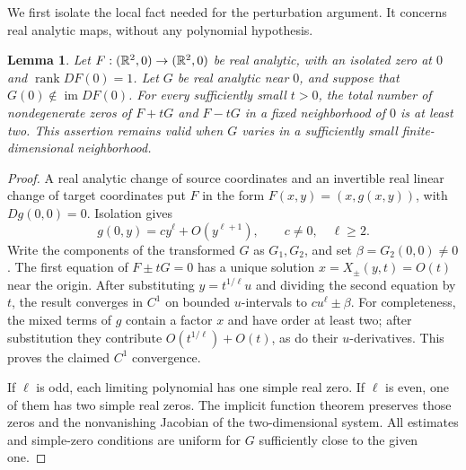 \documentclass[UTF8,11pt]{ctexart}
\newtheorem{lem}[thm]{Lemma}
\theoremstyle{definition}
\numberwithin{equation}{section}
\DeclareMathOperator{\rank}{rank}\DeclareMathOperator{\tr}{tr}\DeclareMathOperator{\Tr}{Tr}
\begin{document}
We first isolate the local fact needed for the perturbation argument.
It concerns real analytic maps, without any polynomial hypothesis.
\begin{lem}\label{b:lem:rankone}
Let $F:(\mathbb R^2,0)\to(\mathbb R^2,0)$ be real analytic, with an isolated zero
at $0$ and $\rank DF(0)=1$. Let $G$ be real analytic near $0$, and
suppose that $G(0)\notin\operatorname{im}DF(0)$.
For every sufficiently small $t>0$, the total number of nondegenerate
zeros of $F+tG$ and $F-tG$ in a fixed neighborhood of $0$ is at least
two. This assertion remains valid when $G$ varies in a sufficiently
small finite-dimensional neighborhood.
\end{lem}
\begin{proof}
A real analytic change of source coordinates and an invertible real
linear change of target coordinates put $F$ in the form
$F(x,y)=(x,g(x,y))$, with $Dg(0,0)=0$. Isolation gives
\[
 g(0,y)=cy^\ell+O(y^{\ell+1}),\qquad c\ne0,\quad\ell\ge2.
\]
Write the components of the transformed $G$ as $G_1,G_2$, and set
$\beta=G_2(0,0)\ne0$. The first equation of $F\pm tG=0$ has a unique
solution $x=X_\pm(y,t)=O(t)$ near the origin. After substituting
$y=t^{1/\ell}u$ and dividing the second equation by $t$, the result
converges in $C^1$ on bounded $u$-intervals to $cu^\ell\pm\beta$.
For completeness, the mixed terms of $g$ contain a factor $x$ and have
order at least two; after substitution they contribute
$O(t^{1/\ell})+O(t)$, as do their $u$-derivatives. This proves the
claimed $C^1$ convergence.

If $\ell$ is odd, each limiting polynomial has one simple real zero.
If $\ell$ is even, one of them has two simple real zeros. The implicit
function theorem preserves those zeros and the nonvanishing Jacobian
of the two-dimensional system. All estimates and simple-zero
conditions are uniform for $G$ sufficiently close to the given one.
\end{proof}
\end{document}
